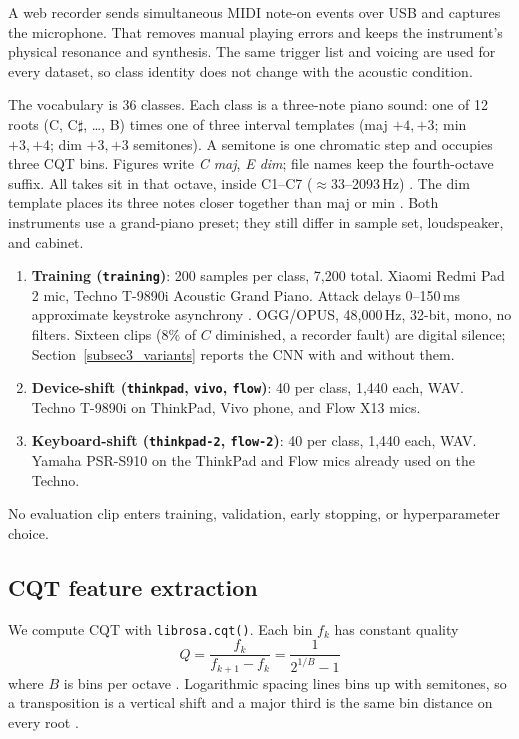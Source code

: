 \documentclass[pdflatex,sn-mathphys-num,iicol]{sn-jnl}
\theoremstyle{thmstyleone}
\theoremstyle{thmstyletwo}
\theoremstyle{thmstylethree}
\begin{document}
A web recorder sends simultaneous MIDI note-on events over USB and captures the microphone. That removes manual playing errors and keeps the instrument's physical resonance and synthesis. The same trigger list and voicing are used for every dataset, so class identity does not change with the acoustic condition.

The vocabulary is 36 classes. Each class is a three-note piano sound: one of 12 roots (C, C$\sharp$, \ldots, B) times one of three interval templates (maj $+4,+3$; min $+3,+4$; dim $+3,+3$ semitones). A semitone is one chromatic step and occupies three CQT bins. Figures write \emph{C maj}, \emph{E dim}; file names keep the fourth-octave suffix. All takes sit in that octave, inside C1--C7 ($\approx$33--2093\,Hz) \cite{Telila2023}\cite{Harte2010}. The dim template places its three notes closer together than maj or min \cite{Byambatsogt2020}. Both instruments use a grand-piano preset; they still differ in sample set, loudspeaker, and cabinet.

\begin{enumerate}[1.]
\item \textbf{Training (\texttt{training})}: 200 samples per class, 7{,}200 total. Xiaomi Redmi Pad 2 mic, Techno T-9890i Acoustic Grand Piano. Attack delays 0--150\,ms approximate keystroke asynchrony \cite{Bella2011}. OGG/OPUS, 48{,}000\,Hz, 32-bit, mono, no filters. Sixteen clips (8\% of $C$ diminished, a recorder fault) are digital silence; Section~\ref{subsec3_variants} reports the CNN with and without them.
\item \textbf{Device-shift (\texttt{thinkpad}, \texttt{vivo}, \texttt{flow})}: 40 per class, 1{,}440 each, WAV. Techno T-9890i on ThinkPad, Vivo phone, and Flow X13 mics.
\item \textbf{Keyboard-shift (\texttt{thinkpad-2}, \texttt{flow-2})}: 40 per class, 1{,}440 each, WAV. Yamaha PSR-S910 on the ThinkPad and Flow mics already used on the Techno.
\end{enumerate}

No evaluation clip enters training, validation, early stopping, or hyperparameter choice.

\subsection{CQT feature extraction}\label{subsec3_2}

We compute CQT with \texttt{librosa.cqt()}. Each bin $f_k$ has constant quality
\begin{equation}
Q = \frac{f_k}{f_{k+1} - f_k} = \frac{1}{2^{1/B} - 1}
\label{eq:cqt}
\end{equation}
where $B$ is bins per octave \cite{Li2021}\cite{Lacoste2007}. Logarithmic spacing lines bins up with semitones, so a transposition is a vertical shift and a major third is the same bin distance on every root \cite{Harte2010}.
\end{document}
